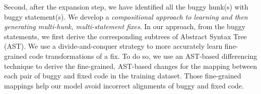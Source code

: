 Second, after the expansion step, we have identified all the buggy
hunk(s) with buggy statement(s). We develop a {\em compositional
  approach to learning and then generating multi-hunk, multi-statement
  fixes}. In our approach, from the buggy statements, we first derive
the corresponding subtrees of Abstract Syntax Tree (AST). We use a
divide-and-conquer strategy to more accurately learn fine-grained code
transformations of a fix. To do so, we use an AST-based differencing
technique to derive the fine-grained, AST-based changes for the
mapping between each pair of buggy and fixed code in the training
dataset. Those fine-grained mappings help our model avoid incorrect
alignments of buggy and fixed code.



